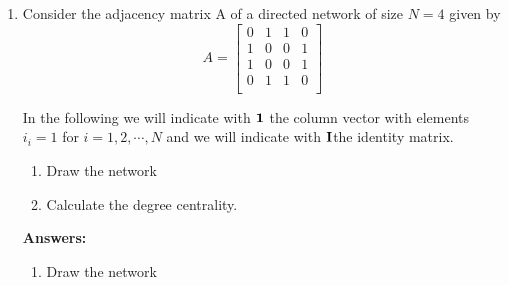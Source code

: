 \documentclass{amsart}
\theoremstyle{definition}
\theoremstyle{remark}
\numberwithin{equation}{section}
\begin{document}
\begin{enumerate}
\begin{enumerate}



\end{enumerate}
\clearpage

\item 
Consider the adjacency matrix A of a directed network of size $N = 4$ given by \vspace{0.2cm}
\begin{equation*}
{A}  = \left\lbrack\begin{array}{cccc}
0 & 1 & 1 & 0 \\
1 & 0 & 0 & 1 \\
1 & 0 & 0 & 1 \\
0 & 1 & 1 & 0 \\
\end{array}\right\rbrack
\end{equation*}

\vspace{0.2cm}
In the following we will indicate with ${\bf 1}$ the column vector with elements $i_i = 1$ for $i = 1, 2, \cdots, N$ and we will indicate with ${\bf I}$the identity matrix. \vspace{0.2cm}
\begin{enumerate}
\item Draw the network
\item Calculate the degree centrality.
\end{enumerate}
\vspace{1cm}

\textbf{Answers:}

\begin{enumerate}
\item Draw the network \vspace{0.2cm}


\end{enumerate}
\end{enumerate}
\end{document}
